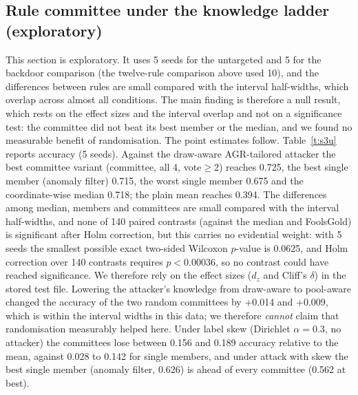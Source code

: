 \documentclass[conference]{IEEEtran}
\begin{document}
\subsection{Rule committee under the knowledge ladder (exploratory)}\label{sec:s3}
This section is exploratory. It uses 5 seeds for the untargeted and 5 for the backdoor comparison (the twelve-rule comparison above used 10), and the differences between rules are small compared with the interval half-widths, which overlap across almost all conditions. The main finding is therefore a null result, which rests on the effect sizes and the interval overlap and not on a significance test: the committee did not beat its best member or the median, and we found no measurable benefit of randomisation. The point estimates follow.
Table~\ref{t:s3u} reports accuracy (5 seeds). Against the draw-aware AGR-tailored attacker the best committee variant (committee, all 4, vote$\ge$2) reaches 0.725, the best single member (anomaly filter) 0.715, the worst single member 0.675 and the coordinate-wise median 0.718; the plain mean reaches 0.394. The differences among median, members and committees are small compared with the interval half-widths, and none of 140 paired contrasts (against the median and FoolsGold) is significant after Holm correction, but this carries no evidential weight: with 5 seeds the smallest possible exact two-sided Wilcoxon $p$-value is 0.0625, and Holm correction over 140 contrasts requires $p<0.00036$, so no contrast could have reached significance. We therefore rely on the effect sizes ($d_z$ and Cliff's $\delta$) in the stored test file. Lowering the attacker's knowledge from draw-aware to pool-aware changed the accuracy of the two random committees by +0.014 and +0.009, which is within the interval widths in this data; we therefore \emph{cannot} claim that randomisation measurably helped here. Under label skew (Dirichlet $\alpha{=}0.3$, no attacker) the committees lose between 0.156 and 0.189 accuracy relative to the mean, against 0.028 to 0.142 for single members, and under attack with skew the best single member (anomaly filter, 0.626) is ahead of every committee (0.562 at best).
\end{document}
